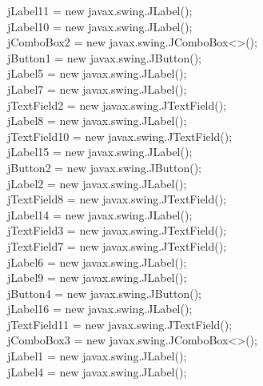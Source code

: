 {{jLabel11 = new javax.swing.JLabel();\\
jLabel10 = new javax.swing.JLabel();\\
jComboBox2 = new javax.swing.JComboBox<>();\\
jButton1 = new javax.swing.JButton();\\
jLabel5 = new javax.swing.JLabel();\\
jLabel7 = new javax.swing.JLabel();\\
jTextField2 = new javax.swing.JTextField();\\
jLabel8 = new javax.swing.JLabel();\\
jTextField10 = new javax.swing.JTextField();\\
jLabel15 = new javax.swing.JLabel();\\
jButton2 = new javax.swing.JButton();\\
jLabel2 = new javax.swing.JLabel();\\
jTextField8 = new javax.swing.JTextField();\\
jLabel14 = new javax.swing.JLabel();\\
jTextField3 = new javax.swing.JTextField();\\
jTextField7 = new javax.swing.JTextField();\\
jLabel6 = new javax.swing.JLabel();\\
jLabel9 = new javax.swing.JLabel();\\
jButton4 = new javax.swing.JButton();\\
jLabel16 = new javax.swing.JLabel();\\
jTextField11 = new javax.swing.JTextField();\\
jComboBox3 = new javax.swing.JComboBox<>();\\
jLabel1 = new javax.swing.JLabel();\\
jLabel4 = new javax.swing.JLabel();\\

}}
